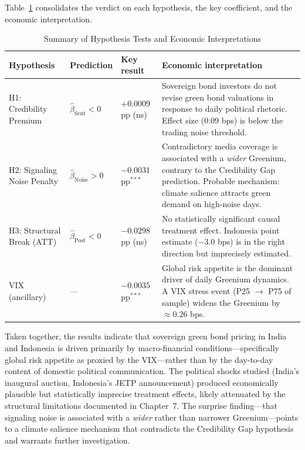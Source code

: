 \documentclass[12pt,a4paper]{article}
\begin{document}
Table~\ref{tab:hypotheses} consolidates the verdict on each hypothesis, the key coefficient, and the economic interpretation.

\begin{table}[H]
\centering
\caption{Summary of Hypothesis Tests and Economic Interpretations}
\label{tab:hypotheses}
\small
\begin{tabularx}{\textwidth}{p{2.0cm}p{2.5cm}p{2.5cm}X}
\toprule
\textbf{Hypothesis} & \textbf{Prediction} & \textbf{Key result} & \textbf{Economic interpretation} \\
\midrule
H1: Credibility Premium & $\hat{\beta}_\text{Sent} < 0$ & $+0.0009$ pp (ns) & Sovereign bond investors do not revise green bond valuations in response to daily political rhetoric. Effect size ($0.09$ bps) is below the trading noise threshold. \\
\addlinespace
H2: Signaling Noise Penalty & $\hat{\beta}_\text{Noise} > 0$ & $-0.0031$ pp$^{***}$ & Contradictory media coverage is associated with a \textit{wider} Greenium, contrary to the Credibility Gap prediction. Probable mechanism: climate salience attracts green demand on high-noise days. \\
\addlinespace
H3: Structural Break (ATT) & $\hat{\beta}_\text{Post} < 0$ & $-0.0298$ pp (ns) & No statistically significant causal treatment effect. Indonesia point estimate ($-3.0$ bps) is in the right direction but imprecisely estimated. \\
\addlinespace
VIX (ancillary) & --- & $-0.0035$ pp$^{***}$ & Global risk appetite is the dominant driver of daily Greenium dynamics. A VIX stress event (P25 $\to$ P75 of sample) widens the Greenium by $\approx 0.26$ bps. \\
\bottomrule
\end{tabularx}
\end{table}

Taken together, the results indicate that sovereign green bond pricing in India and Indonesia is driven primarily by macro-financial conditions---specifically global risk appetite as proxied by the VIX---rather than by the day-to-day content of domestic political communication. The political shocks studied (India's inaugural auction, Indonesia's JETP announcement) produced economically plausible but statistically imprecise treatment effects, likely attenuated by the structural limitations documented in Chapter~7. The surprise finding---that signaling noise is associated with a \textit{wider} rather than narrower Greenium---points to a climate salience mechanism that contradicts the Credibility Gap hypothesis and warrants further investigation.
\end{document}
